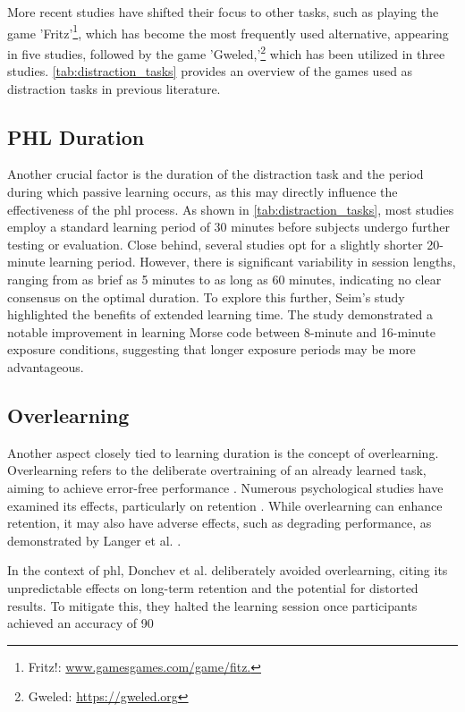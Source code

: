 More recent studies have shifted their focus to other tasks, such as playing the game 'Fritz'\footnote{Fritz!: \url{www.gamesgames.com/game/fitz.}}, which has become the most frequently used alternative, appearing in five studies, followed by the game 'Gweled,'\footnote{Gweled: \url{https://gweled.org}} which has been utilized in three studies. \autoref{tab:distraction_tasks} provides an overview of the games used as distraction tasks in previous literature.


\subsection*{PHL Duration}
Another crucial factor is the duration of the distraction task and the period during which passive learning occurs, as this may directly influence the effectiveness of the \gls{phl} process. As shown in \autoref{tab:distraction_tasks}, most studies employ a standard learning period of 30 minutes before subjects undergo further testing or evaluation. Close behind, several studies opt for a slightly shorter 20-minute learning period. However, there is significant variability in session lengths, ranging from as brief as 5 minutes to as long as 60 minutes, indicating no clear consensus on the optimal duration. To explore this further, Seim's study \cite{Seim2018} highlighted the benefits of extended learning time. The study demonstrated a notable improvement in learning Morse code between 8-minute and 16-minute exposure conditions, suggesting that longer exposure periods may be more advantageous.

\subsection*{Overlearning}
Another aspect closely tied to learning duration is the concept of overlearning. Overlearning refers to the deliberate overtraining of an already learned task, aiming to achieve error-free performance \cite{Krueger1929}. Numerous psychological studies have examined its effects, particularly on retention \cite{Krueger1929, Driskell1992}. While overlearning can enhance retention, it may also have adverse effects, such as degrading performance, as demonstrated by Langer et al. \cite{Langer1979}.

In the context of \gls{phl}, Donchev et al. \cite{Donchev2021} deliberately avoided overlearning, citing its unpredictable effects on long-term retention and the potential for distorted results. To mitigate this, they halted the learning session once participants achieved an accuracy of 90%

